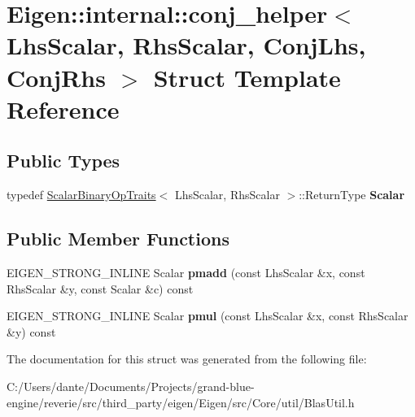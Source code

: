 \hypertarget{struct_eigen_1_1internal_1_1conj__helper}{}\section{Eigen\+::internal\+::conj\+\_\+helper$<$ Lhs\+Scalar, Rhs\+Scalar, Conj\+Lhs, Conj\+Rhs $>$ Struct Template Reference}
\label{struct_eigen_1_1internal_1_1conj__helper}
\subsection*{Public Types}
\begin{DoxyCompactItemize}
\item 
\mbox{\label{struct_eigen_1_1internal_1_1conj__helper_a261dd08a57eefe6d7b44327472ec7c07}} 
typedef \mbox{\hyperlink{struct_eigen_1_1_scalar_binary_op_traits}{Scalar\+Binary\+Op\+Traits}}$<$ Lhs\+Scalar, Rhs\+Scalar $>$\+::Return\+Type {\bfseries Scalar}
\end{DoxyCompactItemize}
\subsection*{Public Member Functions}
\begin{DoxyCompactItemize}
\item 
\mbox{\label{struct_eigen_1_1internal_1_1conj__helper_a7b2020c12ab5c5c09f39303d543a4cf2}} 
E\+I\+G\+E\+N\+\_\+\+S\+T\+R\+O\+N\+G\+\_\+\+I\+N\+L\+I\+NE Scalar {\bfseries pmadd} (const Lhs\+Scalar \&x, const Rhs\+Scalar \&y, const Scalar \&c) const
\item 
\mbox{\label{struct_eigen_1_1internal_1_1conj__helper_a10c2bdc3cc1a624a2c8d5d9ccc89679e}} 
E\+I\+G\+E\+N\+\_\+\+S\+T\+R\+O\+N\+G\+\_\+\+I\+N\+L\+I\+NE Scalar {\bfseries pmul} (const Lhs\+Scalar \&x, const Rhs\+Scalar \&y) const
\end{DoxyCompactItemize}


The documentation for this struct was generated from the following file\+:\begin{DoxyCompactItemize}
\item 
C\+:/\+Users/dante/\+Documents/\+Projects/grand-\/blue-\/engine/reverie/src/third\+\_\+party/eigen/\+Eigen/src/\+Core/util/Blas\+Util.\+h\end{DoxyCompactItemize}
